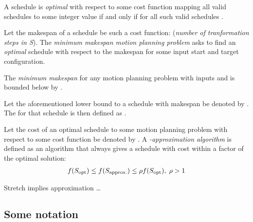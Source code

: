 \begin{definition}\label{def:optimality}
	A schedule  is \emph{optimal} with respect to some cost function  mapping all valid schedules  to some integer value if and only if  for all such valid schedules .
\end{definition}

\begin{definition}\label{def:m3pp}
	Let the makespan of a schedule be such a cost function:  (\textit{number of tranformation steps in S}). The \emph{minimum makespan motion planning problem} asks to find an \emph{optimal} schedule with respect to the makespan  for some input start and target configuration.
\end{definition}

\begin{remark}
	The \emph{minimum makespan} for any motion planning problem with inputs  and  is bounded below by .
\end{remark}

\begin{definition}
	Let the aforementioned lower bound to a schedule with makespan  be denoted by . The  for that schedule is then defined as .
\end{definition}

Let the cost of an optimal schedule \ilmath{\sopt} to some motion planning problem with respect to some cost function  be denoted by . A \ilmath{\rho}\emph{-approximation algorithm} is defined as an algorithm that always gives a schedule with cost within a \ilmath{\rho} factor of the optimal solution:
\begin{align}\label{def:approximation_algorithm}
	f(S_\text{opt}) \leq f(S_\text{approx.}) \leq \rho f(S_\text{opt}), \; \rho > 1
\end{align}

\begin{remark}
	Stretch implies approximation \dots
\end{remark}




\subsection{Some notation}

\begin{definition}
\end{definition}



